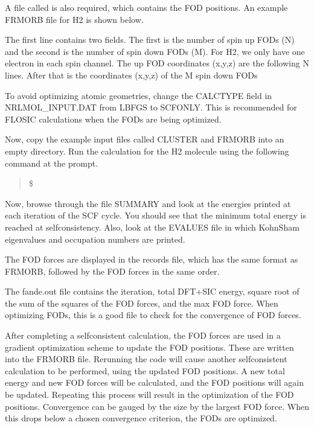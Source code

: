 \documentclass[letterpaper,10pt,english,openany,oneside]{sphinxmanual}
\begin{document}
\sphinxAtStartPar
A file called  is also required, which contains the FOD positions. An example FRMORB file for H2 is shown below.

\begin{sphinxVerbatim}[commandchars=\\\{\}]
  
  
  
\end{sphinxVerbatim}

\sphinxAtStartPar
The first line contains two fields. The first is the number of spin up FODs (N) and the second is the number of spin down FODs (M).
For H2, we only have one electron in each spin channel. The up FOD coordinates (x,y,z) are the following N lines.
After that is the coordinates (x,y,z) of the M spin down FODs

\sphinxAtStartPar
To avoid optimizing atomic geometries, change the CALCTYPE field in NRLMOL\_INPUT.DAT from LBFGS to SCF\sphinxhyphen{}ONLY. This is recommended for FLOSIC
calculations when the FODs are being optimized.

\sphinxAtStartPar
Now, copy the example input files called CLUSTER and FRMORB into an empty directory. Run the calculation for the H2 molecule
using the following command at the prompt.
\begin{quote}

\sphinxAtStartPar
\$ 
\end{quote}

\sphinxAtStartPar
Now, browse through the file SUMMARY and look at the energies printed at each iteration of the SCF cycle. You should see that the minimum
total energy is reached at self\sphinxhyphen{}consistency.
Also, look at the EVALUES file in which Kohn\sphinxhyphen{}Sham eigenvalues and occupation numbers are printed.

\sphinxAtStartPar
The FOD forces are displayed in the records file, which has the same format as FRMORB, followed by the FOD forces in the same order.

\sphinxAtStartPar
The fande.out file contains the iteration, total DFT+SIC energy, square root of the sum of the squares of the FOD forces, and the max FOD force.
When optimizing FODs, this is a good file to check for the convergence of FOD forces.

\sphinxAtStartPar
After completing a self\sphinxhyphen{}consistent calculation, the FOD forces are used in a gradient optimization scheme to update the FOD positions.
These are written into the FRMORB file.  Re\sphinxhyphen{}running the code will cause another self\sphinxhyphen{}consistent calculation to be performed, using the
updated FOD positions.  A new total energy and new FOD forces will be calculated, and the FOD positions will again be updated.
Repeating this process will result in the optimization of the FOD positions.  Convergence can be gauged by the size by the largest FOD
force.  When this drops below a chosen convergence criterion, the FODs are optimized.
\end{document}
